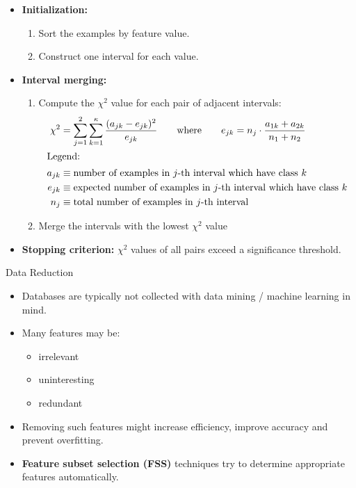 \begin{frame}
	\begin{itemize}
		\item \textbf{Initialization:}
		\begin{enumerate}
			\item Sort the examples by feature value.
			\item Construct one interval for each value.
		\end{enumerate}
		\item \textbf{Interval merging:}
		\begin{enumerate}
			\item Compute the $\chi^2$ value for each pair of adjacent intervals:
			\begin{align}
				\chi^2
					&= \sum_{j=1}^2 \sum_{k=1}^{\kappa} \frac{(a_{jk} - e_{jk})^2}{e_{jk}} \qquad\text{where}\qquad e_{jk} = n_j \cdot \frac{a_{1k} + a_{2k}}{n_1 + n_2} \\
				\shortintertext{Legend:}
				\nonumber
				a_{jk}
					&\equiv \text{number of examples in $j$-th interval which have class $k$} \\
				\nonumber
				e_{jk}
					&\equiv \text{expected number of examples in $j$-th interval which have class $k$} \\
				\nonumber
				n_j
					&\equiv \text{total number of examples in $j$-th interval}
			\end{align}
			\item Merge the intervals with the lowest $\chi^2$ value
		\end{enumerate}
		\item \textbf{Stopping criterion:} $\chi^2$ values of all pairs exceed a significance threshold.
	\end{itemize}
\end{frame}


\begin{dwHeaderFrame}{Data Reduction}
	\begin{itemize}
		\item Databases are typically not collected with data mining / machine learning in mind.
		\item Many features may be:
		\begin{itemize}
			\item irrelevant
			\item uninteresting
			\item redundant
		\end{itemize}
		\item Removing such features might increase efficiency, improve accuracy and prevent overfitting.
		\item \textbf{Feature subset selection (FSS)} techniques try to determine appropriate features automatically.
	\end{itemize}

\end{dwHeaderFrame}


